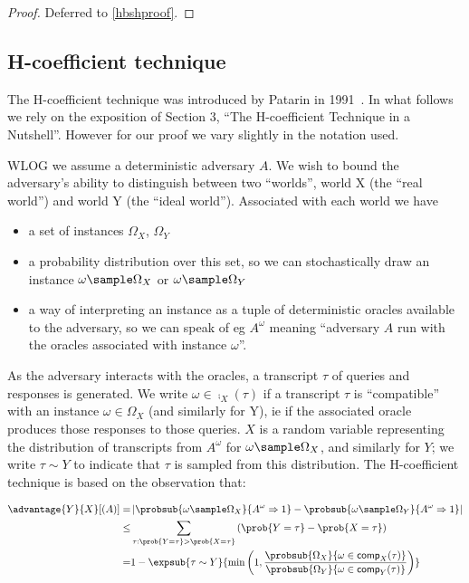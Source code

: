 \documentclass[eprint.tex]{subfiles}
\begin{document}
\begin{proof}Deferred to \autoref{hbshproof}.\renewcommand{\qedsymbol}{}
\end{proof}

\subsection{H-coefficient technique}
The H-coefficient technique was introduced by Patarin in 1991~\cite{ppdes,hco}.
In what follows we rely on the exposition of
\cite{hco2} Section 3,
``The H-coefficient Technique in a Nutshell''.
However for our proof we vary slightly in the notation used.

WLOG we assume a deterministic adversary $A$.
We wish to bound the adversary's ability to distinguish between
two ``worlds'',  world X (the ``real world'') and world Y (the ``ideal world'').
Associated with each world we have
\begin{itemize}
    \item a set of instances $\Omega_X$, $\Omega_Y$
    \item a probability distribution over this set, so we can stochastically draw an instance $\omega \sample \Omega_X$ or $\omega \sample \Omega_Y$
    \item a way of interpreting an instance as a tuple of
    deterministic oracles
    available to the adversary, so we can speak of eg $A^{\omega}$ meaning
    ``adversary $A$ run with the oracles associated with instance $\omega$''.
\end{itemize}

As the adversary interacts with the oracles, a transcript $\tau$
of queries and responses is generated. We write $\omega \in \comp_X(\tau)$
if a transcript $\tau$ is ``compatible'' with an instance $\omega \in \Omega_X$
(and similarly for Y),
ie if the associated oracle produces those responses to those queries. $X$ is
a random variable representing the distribution of transcripts from
$A^\omega$ for $\omega \sample \Omega_X$, and similarly for $Y$;
we write $\tau \sim Y$ to indicate that $\tau$ is sampled from this distribution.
The H-coefficient technique is based on the observation that:

\begin{align*}
    \advantage{Y}{X}[(A)] =&
    \left|\probsub{\omega \sample \Omega_X}{A^\omega \Rightarrow 1}
    - \probsub{\omega \sample \Omega_Y}{A^\omega \Rightarrow 1}\right| \\
    \leq & \sum_{\tau: \prob{Y = \tau} > \prob{X = \tau}}
    \left(\prob{Y = \tau} - \prob{X = \tau}\right) \\
    = & 1 - \expsub{\tau \sim Y}{\min
        \left(1,
           \frac{\probsub{\Omega_X}{\omega \in \comp_X(\tau)}}
           {\probsub{\Omega_Y}{\omega \in \comp_Y(\tau)}}
        \right)}
\end{align*}
\end{document}
